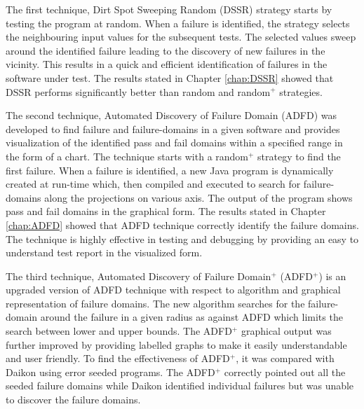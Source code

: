 


The first technique, Dirt Spot Sweeping Random (DSSR) strategy starts by testing the program at random. When a failure is identified, the strategy selects the neighbouring input values for the subsequent tests. The selected values sweep around the identified failure leading to the discovery of new failures in the vicinity. This results in a quick and efficient identification of failures in the software under test. The results stated in Chapter \ref{chap:DSSR} showed that DSSR performs significantly better than random and random$^+$ strategies.

The second technique, Automated Discovery of Failure Domain (ADFD) was developed to find failure and failure-domains in a given software and provides visualization of the identified pass and fail domains within a specified range in the form of a chart. The technique starts with a random$^+$ strategy to find the first failure. When a failure is identified, a new Java program is dynamically created at run-time which, then compiled and executed to search for failure-domains along the projections on various axis. The output of the program shows pass and fail domains in the graphical form. The results stated in Chapter \ref{chap:ADFD} showed that ADFD technique correctly identify the failure domains. The technique is highly effective in testing and debugging by providing an easy to understand test report in the visualized form. 

The third technique, Automated Discovery of Failure Domain$^+$ (ADFD$^+$) is an upgraded version of ADFD technique with respect to algorithm and graphical representation of failure domains. The new algorithm searches for the failure-domain around the failure in a given radius as against ADFD which limits the search between lower and upper bounds. The ADFD$^+$ graphical output was further improved by providing labelled graphs to make it easily understandable and user friendly. To find the effectiveness of ADFD$^+$, it was compared with Daikon using error seeded programs. The ADFD$^+$ correctly pointed out all the seeded failure domains while Daikon identified individual failures but was unable to discover the failure domains. 


